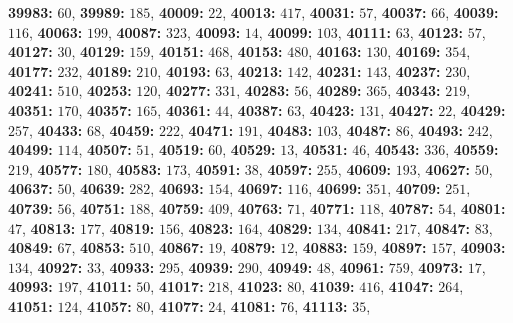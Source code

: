 \textsf{\bfseries 39983:} $60$, \textsf{\bfseries 39989:} $185$, \textsf{\bfseries 40009:} $22$, \textsf{\bfseries 40013:} $417$, \textsf{\bfseries 40031:} $57$, \textsf{\bfseries 40037:} $66$, \textsf{\bfseries 40039:} $116$, \textsf{\bfseries 40063:} $199$, \textsf{\bfseries 40087:} $323$, \textsf{\bfseries 40093:} $14$, \textsf{\bfseries 40099:} $103$, \textsf{\bfseries 40111:} $63$, \textsf{\bfseries 40123:} $57$, \textsf{\bfseries 40127:} $30$, \textsf{\bfseries 40129:} $159$, \textsf{\bfseries 40151:} $468$, \textsf{\bfseries 40153:} $480$, \textsf{\bfseries 40163:} $130$, \textsf{\bfseries 40169:} $354$, \textsf{\bfseries 40177:} $232$, \textsf{\bfseries 40189:} $210$, \textsf{\bfseries 40193:} $63$, \textsf{\bfseries 40213:} $142$, \textsf{\bfseries 40231:} $143$, \textsf{\bfseries 40237:} $230$, \textsf{\bfseries 40241:} $510$, \textsf{\bfseries 40253:} $120$, \textsf{\bfseries 40277:} $331$, \textsf{\bfseries 40283:} $56$, \textsf{\bfseries 40289:} $365$, \textsf{\bfseries 40343:} $219$, \textsf{\bfseries 40351:} $170$, \textsf{\bfseries 40357:} $165$, \textsf{\bfseries 40361:} $44$, \textsf{\bfseries 40387:} $63$, \textsf{\bfseries 40423:} $131$, \textsf{\bfseries 40427:} $22$, \textsf{\bfseries 40429:} $257$, \textsf{\bfseries 40433:} $68$, \textsf{\bfseries 40459:} $222$, \textsf{\bfseries 40471:} $191$, \textsf{\bfseries 40483:} $103$, \textsf{\bfseries 40487:} $86$, \textsf{\bfseries 40493:} $242$, \textsf{\bfseries 40499:} $114$, \textsf{\bfseries 40507:} $51$, \textsf{\bfseries 40519:} $60$, \textsf{\bfseries 40529:} $13$, \textsf{\bfseries 40531:} $46$, \textsf{\bfseries 40543:} $336$, \textsf{\bfseries 40559:} $219$, \textsf{\bfseries 40577:} $180$, \textsf{\bfseries 40583:} $173$, \textsf{\bfseries 40591:} $38$, \textsf{\bfseries 40597:} $255$, \textsf{\bfseries 40609:} $193$, \textsf{\bfseries 40627:} $50$, \textsf{\bfseries 40637:} $50$, \textsf{\bfseries 40639:} $282$, \textsf{\bfseries 40693:} $154$, \textsf{\bfseries 40697:} $116$, \textsf{\bfseries 40699:} $351$, \textsf{\bfseries 40709:} $251$, \textsf{\bfseries 40739:} $56$, \textsf{\bfseries 40751:} $188$, \textsf{\bfseries 40759:} $409$, \textsf{\bfseries 40763:} $71$, \textsf{\bfseries 40771:} $118$, \textsf{\bfseries 40787:} $54$, \textsf{\bfseries 40801:} $47$, \textsf{\bfseries 40813:} $177$, \textsf{\bfseries 40819:} $156$, \textsf{\bfseries 40823:} $164$, \textsf{\bfseries 40829:} $134$, \textsf{\bfseries 40841:} $217$, \textsf{\bfseries 40847:} $83$, \textsf{\bfseries 40849:} $67$, \textsf{\bfseries 40853:} $510$, \textsf{\bfseries 40867:} $19$, \textsf{\bfseries 40879:} $12$, \textsf{\bfseries 40883:} $159$, \textsf{\bfseries 40897:} $157$, \textsf{\bfseries 40903:} $134$, \textsf{\bfseries 40927:} $33$, \textsf{\bfseries 40933:} $295$, \textsf{\bfseries 40939:} $290$, \textsf{\bfseries 40949:} $48$, \textsf{\bfseries 40961:} $759$, \textsf{\bfseries 40973:} $17$, \textsf{\bfseries 40993:} $197$, \textsf{\bfseries 41011:} $50$, \textsf{\bfseries 41017:} $218$, \textsf{\bfseries 41023:} $80$, \textsf{\bfseries 41039:} $416$, \textsf{\bfseries 41047:} $264$, \textsf{\bfseries 41051:} $124$, \textsf{\bfseries 41057:} $80$, \textsf{\bfseries 41077:} $24$, \textsf{\bfseries 41081:} $76$, \textsf{\bfseries 41113:} $35$, 
